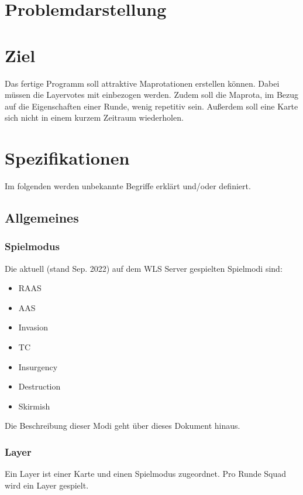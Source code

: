\documentclass[a4paper, 11pt]{scrreprt}
\begin{document}
    \section{Problemdarstellung}

    \section{Ziel}
        Das fertige Programm soll attraktive Maprotationen erstellen können.
        Dabei müssen die Layervotes mit einbezogen werden. Zudem soll die Maprota, im Bezug auf die Eigenschaften einer Runde, wenig repetitiv sein.
        Außerdem soll eine Karte sich nicht in einem kurzem Zeitraum wiederholen.

    \section{Spezifikationen}
    Im folgenden werden unbekannte Begriffe erklärt und/oder definiert.
        \subsection{Allgemeines}
            \subsubsection{Spielmodus}
                Die aktuell (stand Sep. 2022) auf dem \ac{WLS} Server gespielten Spielmodi sind:\\
                \begin{itemize}
                    \item \ac{RAAS}
                    \item \ac{AAS}
                    \item Invasion
                    \item \ac{TC}
                    \item Insurgency
                    \item Destruction
                    \item Skirmish
                \end{itemize}
                Die Beschreibung dieser Modi geht über dieses Dokument hinaus.
            \subsubsection{Layer}
                Ein Layer ist einer Karte und einen Spielmodus zugeordnet.
                Pro Runde Squad wird ein Layer gespielt. 
\end{document}
